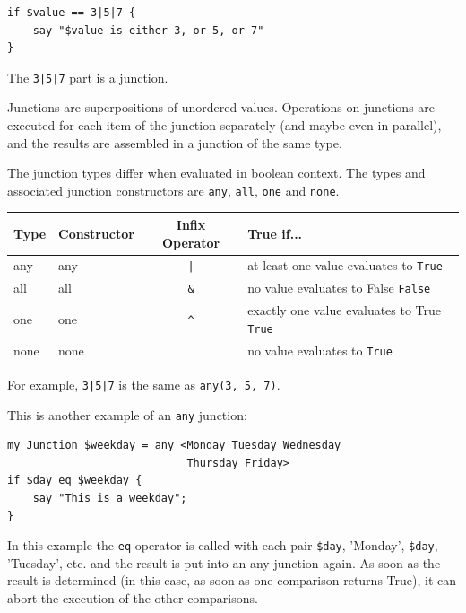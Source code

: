 \begin{verbatim}
if $value == 3|5|7 {
	say "$value is either 3, or 5, or 7"
}
\end{verbatim}

The \verb'3|5|7' part is a junction.

Junctions are superpositions of unordered values. 
Operations on junctions are executed for each item 
of the junction separately (and maybe even in parallel), 
and the results are assembled in a junction of the same 
type.

The junction types differ when evaluated in boolean context. 
The types and associated junction constructors are 
\verb'any', \verb'all', \verb'one' and \verb'none'.

\begin{table}[htb]%
\centering%
\begin{tabular}{llcl}
\toprule%
\textbf{Type} & \textbf{Constructor} & \textbf{Infix Operator}  & \textbf{True if...}                               \\\midrule
any           & any                  & \verb'|'                  & at least one value evaluates to \verb|True|      \\
all           & all                  & \verb'&'                  & no value evaluates to False \verb|False|         \\
one           & one                  & \verb'^'                  & exactly one value evaluates to True \verb|True|  \\
none          & none                 &                           & no value evaluates to \verb|True|                \\\bottomrule
\end{tabular}
\end{table}


For example, \verb'3|5|7' is the same as \verb'any(3, 5, 7)'.

This is another example of an \verb'any' junction:

\begin{verbatim}
my Junction $weekday = any <Monday Tuesday Wednesday 
                            Thursday Friday>
if $day eq $weekday {
    say "This is a weekday";
}
\end{verbatim}

In this example the \verb'eq' operator is called with each 
pair \verb'$day', 'Monday', \verb'$day', 'Tuesday', etc. 
and the result is put into an any-junction again. As 
soon as the result is determined (in this case, as soon 
as one comparison returns True), it can abort the 
execution of the other comparisons.


